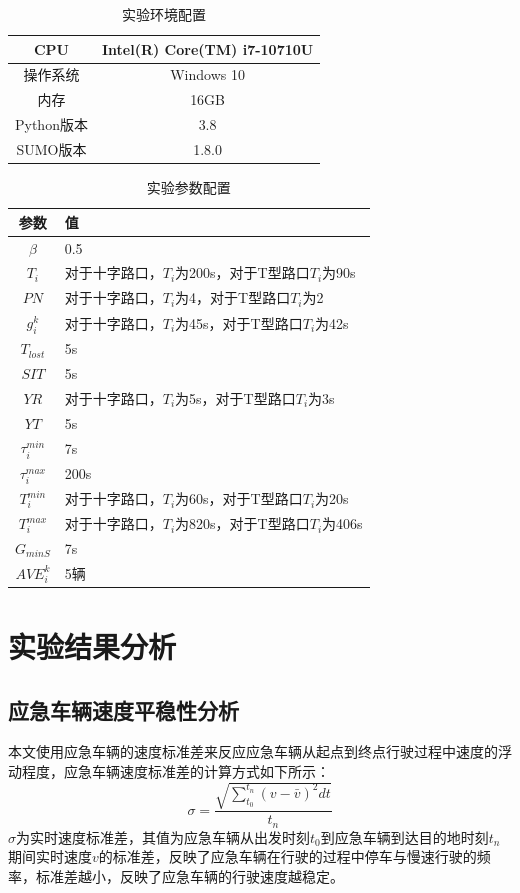 \begin{table}[H]
	\centering
	\caption{实验环境配置}
	\label{table:shiyanhuanjing}
	\begin{tabular}{|c|c|}
		\hline
		CPU & Intel(R) Core(TM) i7-10710U \\ \hline
		操作系统 & Windows 10 \\ \hline
		内存 & 16GB \\ \hline
		Python版本 & 3.8 \\ \hline
		SUMO版本 & 1.8.0 \\ \hline
	\end{tabular}
\end{table}

\begin{table}[H]
	\centering
	\caption{实验参数配置}
	\label{table:shiyancanshu}
	\begin{tabular}{|c|l|}
		\hline
		参数 & 值 \\ \hline
		${\beta}$ & 0.5 \\ \hline
		${T_i}$ & 对于十字路口，${T_i}$为200s，对于T型路口${T_i}$为90s \\ \hline
		${PN}$ &  对于十字路口，${T_i}$为4，对于T型路口${T_i}$为2 \\ \hline
		${g_i^k}$ & 对于十字路口，${T_i}$为45s，对于T型路口${T_i}$为42s  \\ \hline
		${T_{lost}}$ & 5s \\ \hline
		${SIT}$ & 5s \\ \hline
		${YR}$ & 对于十字路口，${T_i}$为5s，对于T型路口${T_i}$为3s \\ \hline
		${YT}$ & 5s \\ \hline
		${\tau_i^{min}}$ & 7s \\ \hline
		${\tau_i^{max}}$ & 200s \\ \hline
		${T_i^{min}}$ & 对于十字路口，${T_i}$为60s，对于T型路口${T_i}$为20s \\ \hline
		${T_i^{max}}$ & 对于十字路口，${T_i}$为820s，对于T型路口${T_i}$为406s \\ \hline
		${G_{minS}}$ & 7s  \\ \hline
		${AVE_i^k}$ & 5辆 \\ \hline
	\end{tabular}
\end{table}


\section{实验结果分析}
\subsection{应急车辆速度平稳性分析}
本文使用应急车辆的速度标准差来反应应急车辆从起点到终点行驶过程中速度的浮动程度，应急车辆速度标准差的计算方式如下所示：
\begin{equation}
	\label{equation:sigma}
	\sigma = \dfrac{\sqrt{\sum_{t_0}^{t_n} (v-\bar{v})^2 dt}}{t_n}
\end{equation}
${\sigma}$为实时速度标准差，其值为应急车辆从出发时刻${t_0}$到应急车辆到达目的地时刻${t_n}$期间实时速度${v}$的标准差，反映了应急车辆在行驶的过程中停车与慢速行驶的频率，标准差越小，反映了应急车辆的行驶速度越稳定。

